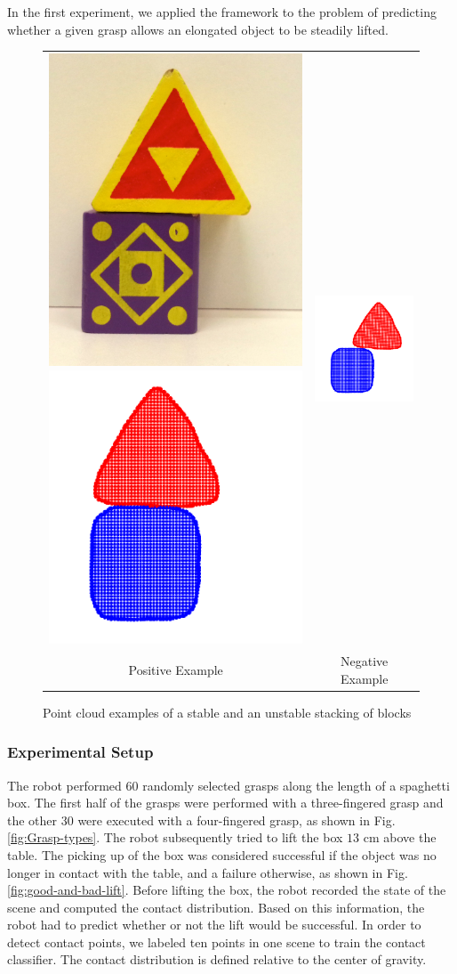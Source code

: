In the first experiment, we applied the framework to the problem of
predicting whether a given grasp allows an elongated object to be
steadily lifted. 
\begin{figure}
\centering{}%
\begin{tabular}{cc}
\includegraphics[width=0.15\columnwidth]{oli/PicsforIROS2014/ExamplePositive}\includegraphics[width=0.15\columnwidth]{oli/PicsforIROS2014/PosExample} & \includegraphics[width=0.15\columnwidth]{oli/PicsforIROS2014/NegExample}\tabularnewline
Positive Example & Negative Example\tabularnewline
\end{tabular}\caption{\label{fig:example-stack-scenes}Point cloud examples of a stable
and an unstable stacking of blocks }
\end{figure}


\subsubsection*{Experimental Setup}

The robot performed $60$ randomly selected grasps along the length of
a spaghetti box. The first half of the grasps were performed with
a three-fingered grasp and the other $30$ were executed with a four-fingered
grasp, as shown in Fig. \ref{fig:Grasp-types}. The robot subsequently
tried to lift the box $13$ cm above the table. The picking up of
the box was considered successful if the object was no longer in contact
with the table, and a failure otherwise, as shown in Fig. \ref{fig:good-and-bad-lift}.
Before lifting the box, the robot recorded the state of the scene
and computed the contact distribution. Based on this information, the robot had to predict whether
or not the lift would be successful. In order to detect contact points,
we labeled ten points in one scene to train the contact classifier.
The contact distribution is defined relative to the center of gravity.

